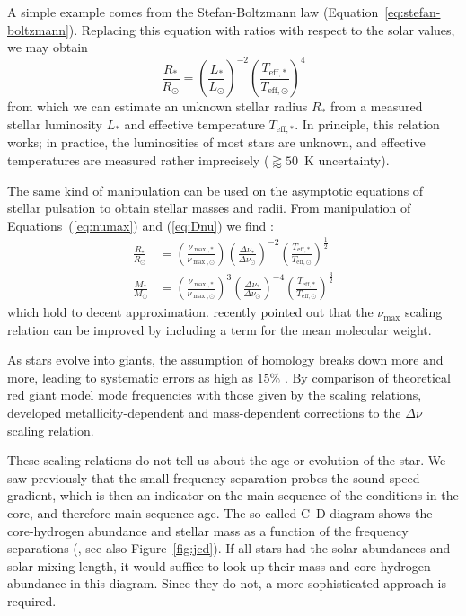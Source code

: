 A simple example comes from the Stefan-Boltzmann law (Equation~\ref{eq:stefan-boltzmann}). 
Replacing this equation with ratios with respect to the solar values, we may obtain 
\begin{equation}
    \frac{R_\ast}{R_\odot}
    =
    \left(
        \frac{L_\ast}{L_\odot}
    \right)^{-2}
    \left(
        \frac{T_{\text{eff},\ast}}{T_{\text{eff},\odot}}
    \right)^4
\end{equation}
from which we can estimate an unknown stellar radius $R_\ast$ from a measured stellar luminosity $L_\ast$ and effective temperature $T_{\text{eff},\ast}$. 
In principle, this relation works; in practice, the luminosities of most stars are unknown, and effective temperatures are measured rather imprecisely (${\gtrapprox 50}$~K uncertainty). 

The same kind of manipulation can be used on the asymptotic equations of stellar pulsation to obtain stellar masses and radii. 
From manipulation of Equations~(\ref{eq:numax}) and (\ref{eq:Dnu}) we find \citep[e.g.,][]{1995A&A...293...87K}:
\begin{align}
    \frac{R_\ast}{R_\odot}
    &=
    \left(
        \frac{\nu_{\max,\ast}}{\nu_{\max,\odot}}
    \right)
    \left(
        \frac{\Delta\nu_\ast}{\Delta\nu_\odot}
    \right)^{-2}
    \left(
        \frac{T_{\text{eff},\ast}}{T_{\text{eff},\odot}}
    \right)^\frac{1}{2}
    \\
    \frac{M_\ast}{M_\odot}
    &=
    \left(
        \frac{\nu_{\max,\ast}}{\nu_{\max,\odot}}
    \right)^3
    \left(
        \frac{\Delta\nu_\ast}{\Delta\nu_\odot}
    \right)^{-4}
    \left(
        \frac{T_{\text{eff},\ast}}{T_{\text{eff},\odot}}
    \right)^\frac{3}{2}
\end{align}
which hold to decent approximation. 
\citet{2017ApJ...843...11V} recently pointed out that the $\nu_{\max}$ scaling relation can be improved by including a term for the mean molecular weight. 

As stars evolve into giants, the assumption of homology breaks down more and more, leading to systematic errors as high as $15\%$ \citep[e.g.,][]{2016ApJ...832..121G}. 
By comparison of theoretical red giant model mode frequencies with those given by the scaling relations, \citet{2016MNRAS.460.4277G, 2017MNRAS.470.2069G} developed metallicity-dependent and mass-dependent corrections to the $\Delta\nu$ scaling relation. 

These scaling relations do not tell us about the age or evolution of the star. 
We saw previously that the small frequency separation probes the sound speed gradient, which is then an indicator on the main sequence of the conditions in the core, and therefore main-sequence age. 
The so-called C--D diagram shows the core-hydrogen abundance and stellar mass as a function of the frequency separations (\citealt{1984srps.conf...11C}, see also Figure~\ref{fig:jcd}). 
If all stars had the solar abundances and solar mixing length, it would suffice to look up their mass and core-hydrogen abundance in this diagram. 
Since they do not, a more sophisticated approach is required. 


